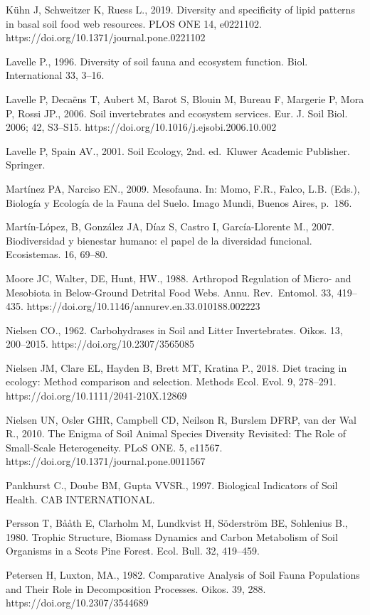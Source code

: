 \documentclass[11pt]{article}
\begin{document}
Kühn J, Schweitzer K, Ruess L., 2019. Diversity and specificity of lipid
patterns in basal soil food web resources. PLOS ONE 14, e0221102.
https://doi.org/10.1371/journal.pone.0221102

Lavelle P., 1996. Diversity of soil fauna and ecosystem function. Biol.
International 33, 3--16.

Lavelle P, Decaëns T, Aubert M, Barot S, Blouin M, Bureau F, Margerie P,
Mora P, Rossi JP., 2006. Soil invertebrates and ecosystem services. Eur.
J. Soil Biol. 2006; 42, S3--S15.
https://doi.org/10.1016/j.ejsobi.2006.10.002

Lavelle P, Spain AV., 2001. Soil Ecology, 2nd. ed.~Kluwer Academic
Publisher. Springer.

Martínez PA, Narciso EN., 2009. Mesofauna. In: Momo, F.R., Falco, L.B.
(Eds.), Biología y Ecología de la Fauna del Suelo. Imago Mundi, Buenos
Aires, p.~186.

Martín-López, B, González JA, Díaz S, Castro I, García-Llorente M.,
2007. Biodiversidad y bienestar humano: el papel de la diversidad
funcional. Ecosistemas. 16, 69--80.

Moore JC, Walter, DE, Hunt, HW., 1988. Arthropod Regulation of Micro-
and Mesobiota in Below-Ground Detrital Food Webs. Annu. Rev.~Entomol.
33, 419--435. https://doi.org/10.1146/annurev.en.33.010188.002223

Nielsen CO., 1962. Carbohydrases in Soil and Litter Invertebrates.
Oikos. 13, 200--2015. https://doi.org/10.2307/3565085

Nielsen JM, Clare EL, Hayden B, Brett MT, Kratina P., 2018. Diet tracing
in ecology: Method comparison and selection. Methods Ecol. Evol. 9,
278--291. https://doi.org/10.1111/2041-210X.12869

Nielsen UN, Osler GHR, Campbell CD, Neilson R, Burslem DFRP, van der Wal
R., 2010. The Enigma of Soil Animal Species Diversity Revisited: The
Role of Small-Scale Heterogeneity. PLoS ONE. 5, e11567.
https://doi.org/10.1371/journal.pone.0011567

Pankhurst C., Doube BM, Gupta VVSR., 1997. Biological Indicators of Soil
Health. CAB INTERNATIONAL.

Persson T, Bååth E, Clarholm M, Lundkvist H, Söderström BE, Sohlenius
B., 1980. Trophic Structure, Biomass Dynamics and Carbon Metabolism of
Soil Organisms in a Scots Pine Forest. Ecol. Bull. 32, 419--459.

Petersen H, Luxton, MA., 1982. Comparative Analysis of Soil Fauna
Populations and Their Role in Decomposition Processes. Oikos. 39, 288.
https://doi.org/10.2307/3544689
\end{document}
